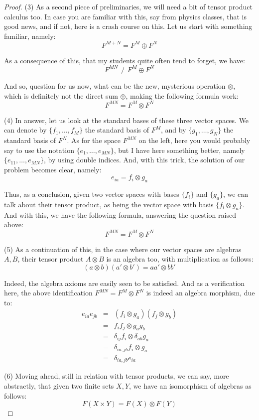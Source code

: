 \documentclass[12pt]{amsbook}
\begin{document}
\begin{proof}
(3) As a second piece of preliminaries, we will need a bit of tensor product calculus too. In case you are familiar with this, say from physics classes, that is good news, and if not, here is a crash course on this. Let us start with something familiar, namely:
$$F^{M+N}=F^M\oplus F^N$$

As a consequence of this, that my students quite often tend to forget, we have:
$$F^{MN}\neq F^M\oplus F^N$$

And so, question for us now, what can be the new, mysterious operation $\otimes$, which is definitely not the direct sum $\oplus$, making the following formula work:
$$F^{MN}=F^M\otimes F^N$$

(4) In answer, let us look at the standard bases of these three vector spaces. We can denote by $\{f_1,\ldots,f_M\}$ the standard basis of $F^M$, and by $\{g_1,\ldots,g_N\}$ the standard basis of $F^N$. As for the space $F^{MN}$ on the left, here you would probably say to use the notation $\{e_1,\ldots,e_{MN}\}$, but I have here something better, namely $\{e_{11},\ldots,e_{MN}\}$, by using double indices. And, with this trick, the solution of our problem becomes clear, namely:
$$e_{ia}=f_i\otimes g_a$$

Thus, as a conclusion, given two vector spaces with bases $\{f_i\}$ and $\{g_a\}$, we can talk about their tensor product, as being the vector space with basis $\{f_i\otimes g_a\}$. And with this, we have the following formula, answering the question raised above: 
$$F^{MN}=F^M\otimes F^N$$

(5) As a continuation of this, in the case where our vector spaces are algebras $A,B$, their tensor product $A\otimes B$ is an algebra too, with multiplication as follows:
$$(a\otimes b)(a'\otimes b')=aa'\otimes bb'$$

Indeed, the algebra axioms are easily seen to be satisfied. And as a verification here, the above identification $F^{MN}=F^M\otimes F^N$ is indeed an algebra morphism, due to:
\begin{eqnarray*}
e_{ia}e_{jb}
&=&(f_i\otimes g_a)(f_j\otimes g_b)\\
&=&f_if_j\otimes g_ag_b\\
&=&\delta_{ij}f_i\otimes\delta_{ab}g_a\\
&=&\delta_{ia,jb}f_i\otimes g_a\\
&=&\delta_{ia,jb}e_{ia}
\end{eqnarray*}

(6) Moving ahead, still in relation with tensor products, we can say, more abstractly, that given two finite sets $X,Y$, we have an isomorphism of algebras as follows:
$$F(X\times Y)=F(X)\otimes F(Y)$$


\end{proof}
\end{document}
